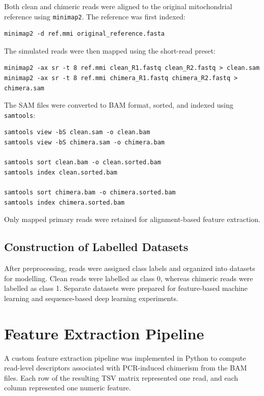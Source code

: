 Both clean and chimeric reads were aligned to the original mitochondrial reference using \texttt{minimap2}. The reference was first indexed:

\begin{verbatim}
minimap2 -d ref.mmi original_reference.fasta
\end{verbatim}

The simulated reads were then mapped using the short-read preset:

\begin{verbatim}
minimap2 -ax sr -t 8 ref.mmi clean_R1.fastq clean_R2.fastq > clean.sam
minimap2 -ax sr -t 8 ref.mmi chimera_R1.fastq chimera_R2.fastq > chimera.sam
\end{verbatim}

The SAM files were converted to BAM format, sorted, and indexed using \texttt{samtools}:

\begin{verbatim}
samtools view -bS clean.sam -o clean.bam
samtools view -bS chimera.sam -o chimera.bam

samtools sort clean.bam -o clean.sorted.bam
samtools index clean.sorted.bam

samtools sort chimera.bam -o chimera.sorted.bam
samtools index chimera.sorted.bam
\end{verbatim}

Only mapped primary reads were retained for alignment-based feature extraction.

\subsection{Construction of Labelled Datasets}

After preprocessing, reads were assigned class labels and organized into datasets for modelling. Clean reads were labelled as class 0, whereas chimeric reads were labelled as class 1. Separate datasets were prepared for feature-based machine learning and sequence-based deep learning experiments.

\section{Feature Extraction Pipeline}

A custom feature extraction pipeline was implemented in Python to compute read-level descriptors associated with PCR-induced chimerism from the BAM files. Each row of the resulting TSV matrix represented one read, and each column represented one numeric feature.

